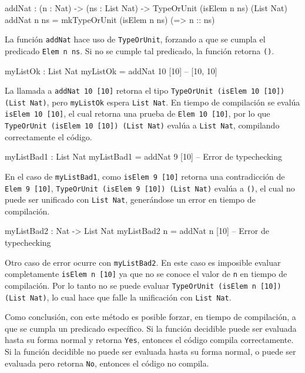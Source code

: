 \begin{code}
addNat : (n : Nat) -> (ns : List Nat) ->
  TypeOrUnit (isElem n ns) (List Nat)
addNat n ns = mkTypeOrUnit (isElem n ns)
  (\isElem => n :: ns)
\end{code}

La función \texttt{addNat} hace uso de \texttt{TypeOrUnit}, forzando a que se cumpla el predicado \texttt{Elem n ns}. Si no se cumple tal predicado, la función retorna \texttt{()}.

\begin{code}
myListOk : List Nat
myListOk = addNat 10 [10] -- [10, 10]
\end{code}

La llamada a \texttt{addNat 10 [10]} retorna el tipo \texttt{TypeOrUnit (isElem 10 [10]) (List Nat)}, pero \texttt{myListOk} espera \texttt{List Nat}. En tiempo de compilación se evalúa \texttt{isElem 10 [10]}, el cual retorna una prueba de \texttt{Elem 10 [10]}, por lo que \texttt{TypeOrUnit (isElem 10 [10]) (List Nat)} evalúa a \texttt{List Nat}, compilando correctamente el código.

\begin{code}
myListBad1 : List Nat
myListBad1 = addNat 9 [10] -- Error de typechecking
\end{code}

En el caso de \texttt{myListBad1}, como \texttt{isElem 9 [10]} retorna una contradicción de \texttt{Elem 9 [10]}, \texttt{TypeOrUnit (isElem 9 [10]) (List Nat)} evalúa a \texttt{()}, el cual no puede ser unificado con \texttt{List Nat}, generándose un error en tiempo de compilación.

\begin{code}
myListBad2 : Nat -> List Nat
myListBad2 n = addNat n [10] -- Error de typechecking
\end{code}

Otro caso de error ocurre con \texttt{myListBad2}. En este caso es imposible evaluar completamente \texttt{isElem n [10]} ya que no se conoce el valor de \texttt{n} en tiempo de compilación. Por lo tanto no se puede evaluar \texttt{TypeOrUnit (isElem n [10]) (List Nat)}, lo cual hace que falle la unificación con \texttt{List Nat}.

Como conclusión, con este método es posible forzar, en tiempo de compilación, a que se cumpla un predicado específico. Si la función decidible puede ser evaluada hasta su forma normal y retorna \texttt{Yes}, entonces el código compila correctamente. Si la función decidible no puede ser evaluada hasta su forma normal, o puede ser evaluada pero retorna \texttt{No}, entonces el código no compila.

